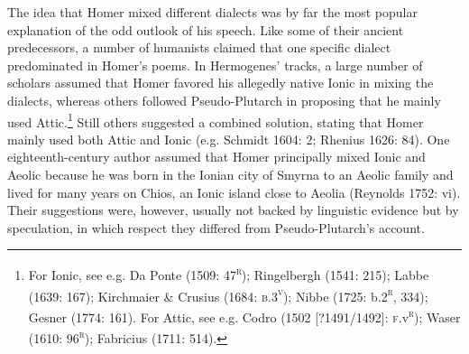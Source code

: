 \begin{styleStandard}
The idea that Homer mixed different dialects was by far the most popular explanation of the odd outlook of his speech. Like some of their ancient predecessors, a number of humanists claimed that one specific dialect predominated in Homer’s poems. In Hermogenes’ tracks, a large number of scholars assumed that Homer favored his allegedly native Ionic in mixing the dialects, whereas others followed Pseudo-Plutarch in proposing that he mainly used Attic.\footnote{ For Ionic, see e.g. Da Ponte (1509: 47\textsc{\textsuperscript{r}}); Ringelbergh (1541: 215); Labbe (1639: 167); Kirchmaier \& Crusius (1684: \textsc{b.3}\textsc{\textsuperscript{v}}); Nibbe (1725: b.2\textsc{\textsuperscript{r}}, 334); Gesner (1774: 161). For Attic, see e.g. Codro (1502 [?1491/1492]: \textsc{f.}v\textsc{\textsuperscript{r}}); Waser (1610: 96\textsc{\textsuperscript{r}}); Fabricius (1711: 514).} Still others suggested a combined solution, stating that Homer mainly used both Attic and Ionic (e.g. Schmidt 1604: 2; Rhenius 1626: 84). One eighteenth-century author assumed that Homer principally mixed Ionic and Aeolic because he was born in the Ionian city of Smyrna to an Aeolic family and lived for many years on Chios, an Ionic island close to Aeolia (Reynolds 1752: vi). Their suggestions were, however, usually not backed by linguistic evidence but by speculation, in which respect they differed from Pseudo-Plutarch’s account.
\end{styleStandard}

